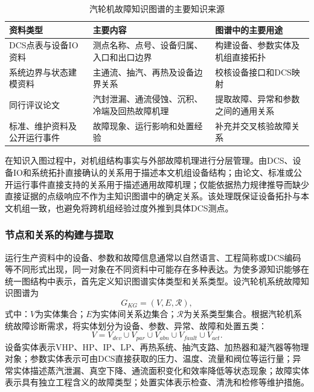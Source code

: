 \begin{table}[htbp]
    \centering
    \caption{汽轮机故障知识图谱的主要知识来源}
    \label{tab:kg_sources_v6}
    \begin{tabular}{p{3.8cm}p{5.2cm}p{5.2cm}}
        \toprule
        资料类型 & 主要内容 & 图谱中的主要用途 \\
        \midrule
        DCS点表与设备IO资料 & 测点名称、点号、设备归属、入口和出口边界 & 构建设备、参数实体及机组直接拓扑 \\
        系统边界与状态建模资料 & 主通流、抽汽、再热及设备边界关系 & 校核设备接口和DCS映射 \\
        同行评议论文 & 汽封泄漏、通流侵蚀、沉积、冷端及回热故障机理 & 提取故障、异常和参数之间的通用关系 \\
        标准、维护资料及公开运行事件 & 故障现象、运行影响和处置经验 & 补充并交叉核验故障关系 \\
        \bottomrule
    \end{tabular}
\end{table}

在知识入图过程中，对机组结构事实与外部故障机理进行分层管理。由DCS、设备IO和系统拓扑直接确认的关系用于描述本文机组设备结构；由论文、标准或公开运行事件直接支持的关系用于描述通用故障机理；仅能依据热力规律推导而缺少直接证据的点级响应不作为主知识图谱中的确定关系。该处理既保证设备拓扑与本文机组一致，也避免将跨机组经验过度外推到具体DCS测点。

\subsubsection{节点和关系的构建与提取}
\label{subsubsec:entity_relation_v6}

运行生产资料中的设备、参数和故障信息通常以自然语言、工程简称或DCS编码等不同形式出现，同一对象在不同资料中可能存在多种表达。为使多源知识能够在统一图结构中表示，首先定义知识图谱实体类型和关系类型。设汽轮机系统故障知识图谱为
\begin{equation}
G_{KG}=(V,E,\mathcal R),
\end{equation}
式中：$V$为实体集合；$E$为实体间关系边集合；$\mathcal R$为关系类型集合。根据汽轮机系统故障诊断需求，将实体划分为设备、参数、异常、故障和处置五类：
\begin{equation}
V=V_{dev}\cup V_{par}\cup V_{abn}\cup V_{fault}\cup V_{act}.
\end{equation}
设备实体表示VHP、HP、IP、LP、再热系统、抽汽支路、加热器和凝汽器等物理对象；参数实体表示可由DCS直接获取的压力、温度、流量和阀位等运行量；异常实体描述蒸汽泄漏、真空下降、通流面积变化和效率降低等状态现象；故障实体表示具有独立工程含义的故障类型；处置实体表示检查、清洗和检修等维护措施。

